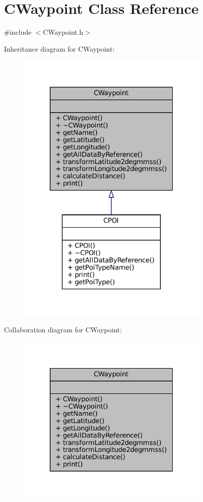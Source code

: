 \hypertarget{classCWaypoint}{}\section{C\+Waypoint Class Reference}
\label{classCWaypoint}


{\ttfamily \#include $<$C\+Waypoint.\+h$>$}



Inheritance diagram for C\+Waypoint\+:
\nopagebreak
\begin{figure}[H]
\begin{center}
\leavevmode
\includegraphics[width=265pt]{classCWaypoint__inherit__graph}
\end{center}
\end{figure}


Collaboration diagram for C\+Waypoint\+:
\nopagebreak
\begin{figure}[H]
\begin{center}
\leavevmode
\includegraphics[width=265pt]{classCWaypoint__coll__graph}
\end{center}
\end{figure}
